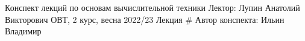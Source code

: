 \documentclass[a4paper,12pt]{article}
\begin{document}
    {Конспект лекций по основам вычислительной техники}%
    {Лектор: Лупин Анатолий Викторович}%
    {ОВТ, 2 курс, весна 2022/23}%
    {Лекция \#\thesec}%
    {Автор конспекта: Ильин Владимир}

    
\end{document}
